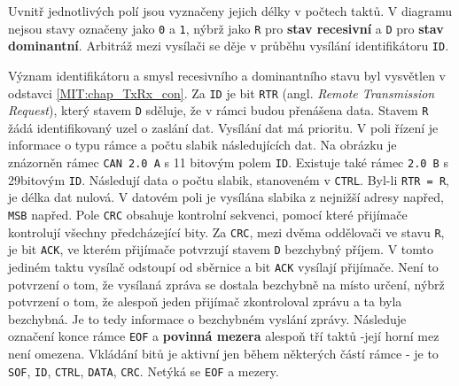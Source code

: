         Uvnitř jednotlivých polí jsou vyznačeny jejich délky v počtech taktů. V diagramu nejsou 
        stavy označeny jako \texttt{0} a \texttt{1}, nýbrž jako \texttt{R} pro \textbf{stav 
        recesivní} a \texttt{D} pro \textbf{stav dominantní}. Arbitráž mezi vysílači se děje v 
        průběhu vysílání identifikátoru \texttt{ID}. 
        
        Význam identifikátoru a smysl recesivního a dominantního stavu byl vysvětlen v odstavci 
        \ref{MIT:chap_TxRx_con}. Za \texttt{ID} je bit \texttt{RTR} (angl. \emph{Remote 
        Transmission Request}), který stavem \texttt{D} sděluje, že v rámci budou přenášena data. 
        Stavem \texttt{R} žádá identifikovaný uzel o zaslání dat. Vysílání dat má prioritu. V poli 
        řízení je informace o typu rámce a počtu slabik následujících dat. Na obrázku je znázorněn 
        rámec \texttt{CAN 2.0 A} s 11 bitovým polem \texttt{ID}. Existuje také rámec \texttt{2.0 B} 
        s 29bitovým \texttt{ID}. Následují data o počtu slabik, stanoveném v \texttt{CTRL}. Byl-li 
        \texttt{RTR = R}, je délka dat nulová. V datovém poli je vysílána slabika z nejnižší adresy 
        napřed, \texttt{MSB} napřed. Pole \texttt{CRC} obsahuje kontrolní sekvenci, pomocí které 
        přijímače kontrolují všechny předcházející bity. Za \texttt{CRC}, mezi dvěma oddělovači ve 
        stavu \texttt{R}, je bit \texttt{ACK}, ve kterém přijímače potvrzují stavem \texttt{D} 
        bezchybný příjem. V tomto jediném taktu vysílač odstoupí od sběrnice a bit \texttt{ACK} 
        vysílají přijímače. Není to potvrzení o tom, že vysílaná zpráva se dostala bezchybně na 
        místo určení, nýbrž potvrzení o tom, že alespoň jeden přijímač zkontroloval zprávu a ta 
        byla bezchybná. Je to tedy informace o bezchybném vyslání zprávy. Následuje označení konce 
        rámce \texttt{EOF} a \textbf{povinná mezera} alespoň tří taktů -její horní mez není 
        omezena. Vkládání bitů je aktivní jen během některých částí rámce - je to \texttt{SOF}, 
        \texttt{ID}, \texttt{CTRL}, \texttt{DATA}, \texttt{CRC}. Netýká se \texttt{EOF} a mezery.
        
